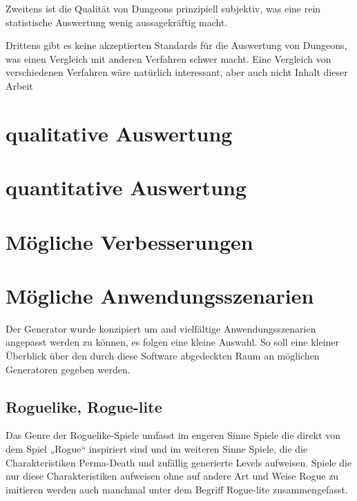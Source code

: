 Zweitens ist die Qualität von Dungeons prinzipiell subjektiv, was eine rein statistische Auswertung wenig aussagekräftig macht.

Drittens gibt es keine akzeptierten Standards für die Auswertung von Dungeons, was einen Vergleich mit anderen Verfahren schwer macht. Eine Vergleich von verschiedenen Verfahren wäre natürlich interessant, aber auch nicht Inhalt dieser Arbeit 

\section{qualitative Auswertung}

\section{quantitative Auswertung}


\section{Mögliche Verbesserungen}\label{s.verbesserungen}


\section{Mögliche Anwendungsszenarien}\label{s.anwendungsmöglichkeiten}

Der Generator wurde konzipiert um and vielfältige Anwendungsszenarien angepasst werden zu können, es folgen eine kleine Auswahl. So soll eine kleiner Überblick über den durch diese Software abgedeckten Raum an möglichen Generatoren gegeben werden.

\subsection{Roguelike, Rogue-lite}

Das Genre der Roguelike-Spiele umfasst im engeren Sinne Spiele die direkt von dem Spiel „Rogue“ inspiriert sind und im weiteren Sinne Spiele, die die Charakteristiken Perma-Death und zufällig generierte Levels aufweisen. Spiele die nur diese Charakteristiken aufweisen ohne auf andere Art und Weise Rogue zu imitieren werden auch manchmal unter dem Begriff Rogue-lite zusammengefasst.

